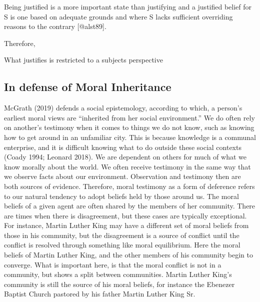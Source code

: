 \documentclass[12pt]{book}
\theoremstyle{definition}
\theoremstyle{remark}
\newcommand{\NormalTok}[1]{#1}
\newenvironment{Shaded}{}{}
\newenvironment{Highlighting}{}{}
\begin{document}
\begin{Shaded}
\begin{Highlighting}[]

\NormalTok{Being justified is a more important state than justifying and a justified belief for S is one based on adequate grounds and where S lacks sufficient overriding reasons to the contrary [@alst89].}
\end{Highlighting}
\end{Shaded}

Therefore,

\begin{Shaded}
\begin{Highlighting}[]

\NormalTok{What justifies is restricted to a subject\textquotesingle{}s perspective}
\end{Highlighting}
\end{Shaded}

\subsection*{In defense of Moral Inheritance}\label{in-defense-of-moral-inheritance}

McGrath (2019) defends a social epistemology, according to which, a person's earliest moral views are ``inherited from her social environment.'' We do often rely on another's testimony when it comes to things we do not know, such as knowing how to get around in an unfamiliar city. This is because knowledge is a communal enterprise, and it is difficult knowing what to do outside these social contexts (Coady 1994; Leonard 2018). We are dependent on others for much of what we know morally about the world. We often receive testimony in the same way that we observe facts about our environment. Observation and testimony then are both sources of evidence. Therefore, moral testimony as a form of deference refers to our natural tendency to adopt beliefs held by those around us. The moral beliefs of a given agent are often shared by the members of her community. There are times when there is disagreement, but these cases are typically exceptional. For instance, Martin Luther King may have a different set of moral beliefs from those in his community, but the disagreement is a source of conflict until the conflict is resolved through something like moral equilibrium. Here the moral beliefs of Martin Luther King, and the other members of his community begin to converge. What is important here, is that the moral conflict is not in a community, but shows a split between communities. Martin Luther King's community is still the source of his moral beliefs, for instance the Ebenezer Baptist Church pastored by his father Martin Luther King Sr.
\end{document}
